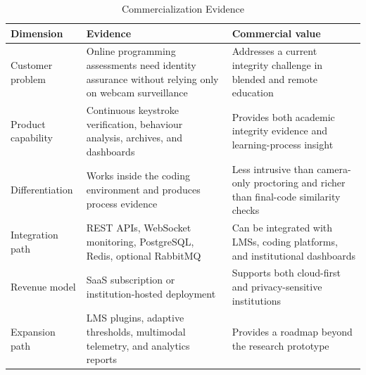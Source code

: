 \begin{table}[H]
  \centering
  \caption{Commercialization Evidence}
  \label{tab:commercialization-evidence}
  \begin{singlespace}
  \begin{tabularx}{\textwidth}{@{}p{3.0cm}p{4.4cm}p{5.6cm}@{}}
    \toprule
    \textbf{Dimension} & \textbf{Evidence} & \textbf{Commercial value} \\
    \midrule
    Customer problem & Online programming assessments need identity assurance without relying only on webcam surveillance & Addresses a current integrity challenge in blended and remote education \\
    Product capability & Continuous keystroke verification, behaviour analysis, archives, and dashboards & Provides both academic integrity evidence and learning-process insight \\
    Differentiation & Works inside the coding environment and produces process evidence & Less intrusive than camera-only proctoring and richer than final-code similarity checks \\
    Integration path & REST APIs, WebSocket monitoring, PostgreSQL, Redis, optional RabbitMQ & Can be integrated with LMSs, coding platforms, and institutional dashboards \\
    Revenue model & SaaS subscription or institution-hosted deployment & Supports both cloud-first and privacy-sensitive institutions \\
    Expansion path & LMS plugins, adaptive thresholds, multimodal telemetry, and analytics reports & Provides a roadmap beyond the research prototype \\
    \bottomrule
  \end{tabularx}
  \end{singlespace}
\end{table}

\clearpage
